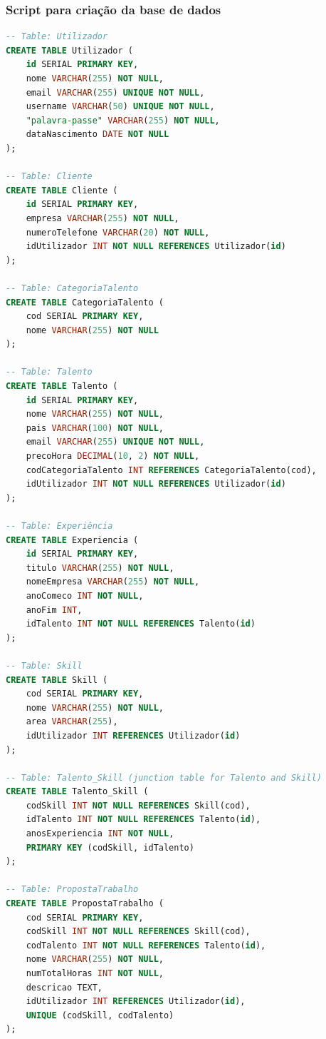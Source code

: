 \subsubsection{Script para criação da base de dados}
\begin{lstlisting}[language=SQL]
-- Table: Utilizador
CREATE TABLE Utilizador (
    id SERIAL PRIMARY KEY,
    nome VARCHAR(255) NOT NULL,
    email VARCHAR(255) UNIQUE NOT NULL,
    username VARCHAR(50) UNIQUE NOT NULL,
    "palavra-passe" VARCHAR(255) NOT NULL,
    dataNascimento DATE NOT NULL
);

-- Table: Cliente
CREATE TABLE Cliente (
    id SERIAL PRIMARY KEY,
    empresa VARCHAR(255) NOT NULL,
    numeroTelefone VARCHAR(20) NOT NULL,
    idUtilizador INT NOT NULL REFERENCES Utilizador(id)
);

-- Table: CategoriaTalento
CREATE TABLE CategoriaTalento (
    cod SERIAL PRIMARY KEY,
    nome VARCHAR(255) NOT NULL
);

-- Table: Talento
CREATE TABLE Talento (
    id SERIAL PRIMARY KEY,
    nome VARCHAR(255) NOT NULL,
    pais VARCHAR(100) NOT NULL,
    email VARCHAR(255) UNIQUE NOT NULL,
    precoHora DECIMAL(10, 2) NOT NULL,
    codCategoriaTalento INT REFERENCES CategoriaTalento(cod),
    idUtilizador INT NOT NULL REFERENCES Utilizador(id)
);

-- Table: Experiência
CREATE TABLE Experiencia (
    id SERIAL PRIMARY KEY,
    titulo VARCHAR(255) NOT NULL,
    nomeEmpresa VARCHAR(255) NOT NULL,
    anoComeco INT NOT NULL,
    anoFim INT,
    idTalento INT NOT NULL REFERENCES Talento(id)
);

-- Table: Skill
CREATE TABLE Skill (
    cod SERIAL PRIMARY KEY,
    nome VARCHAR(255) NOT NULL,
    area VARCHAR(255),
    idUtilizador INT REFERENCES Utilizador(id)
);

-- Table: Talento_Skill (junction table for Talento and Skill)
CREATE TABLE Talento_Skill (
    codSkill INT NOT NULL REFERENCES Skill(cod),
    idTalento INT NOT NULL REFERENCES Talento(id),
    anosExperiencia INT NOT NULL,
    PRIMARY KEY (codSkill, idTalento)
);

-- Table: PropostaTrabalho
CREATE TABLE PropostaTrabalho (
    cod SERIAL PRIMARY KEY,
    codSkill INT NOT NULL REFERENCES Skill(cod),
    codTalento INT NOT NULL REFERENCES Talento(id),
    nome VARCHAR(255) NOT NULL,
    numTotalHoras INT NOT NULL,
    descricao TEXT,
    idUtilizador INT REFERENCES Utilizador(id),
    UNIQUE (codSkill, codTalento)
);
\end{lstlisting}